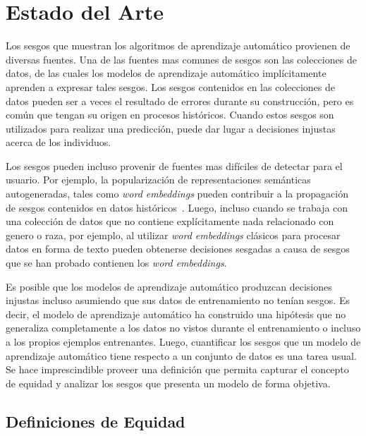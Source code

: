 \chapter{Estado del Arte}\label{chapter:state-of-the-art}


Los sesgos que muestran los algoritmos de aprendizaje automático provienen de diversas fuentes.
Una de las fuentes mas comunes de sesgos son las colecciones de datos, de las cuales los modelos de aprendizaje automático implícitamente aprenden a expresar tales sesgos.
Los sesgos contenidos en las colecciones de datos pueden ser a veces el resultado de errores durante su construcción,  pero es común que tengan su origen en procesos históricos.
Cuando estos sesgos son utilizados para realizar una predicción, puede dar lugar a decisiones injustas acerca de los individuos.

Los sesgos pueden incluso provenir de fuentes mas difíciles de detectar para el usuario.
Por ejemplo, la popularización de representaciones semánticas autogeneradas, tales como \emph{word embeddings} pueden contribuir a la propagación de sesgos contenidos en datos históricos~\parencite{bolukbasi2016man}.
Luego, incluso cuando se trabaja con una colección de datos que no contiene explícitamente nada relacionado con genero o raza, por ejemplo, al utilizar \emph{word embeddings} clásicos para procesar datos en forma de texto pueden obtenerse decisiones sesgadas a causa de sesgos que se han probado contienen los \emph{word embeddings}.

Es posible que los modelos de aprendizaje automático produzcan decisiones injustas incluso asumiendo que sus datos de entrenamiento no tenían sesgos.
Es decir, el modelo de aprendizaje automático ha construido una hipótesis que no generaliza completamente a los datos no vistos durante el entrenamiento o incluso a los propios ejemplos entrenantes.
Luego, cuantificar los sesgos que un modelo de aprendizaje automático tiene respecto a un conjunto de datos es una tarea usual.
Se hace imprescindible proveer una definición que permita capturar el concepto de equidad y analizar los sesgos que presenta un modelo de forma objetiva.

\section{Definiciones de Equidad}

